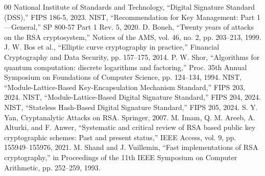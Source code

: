 \documentclass[conference]{IEEEtran}
\begin{document}
\begin{thebibliography}{00}
 National Institute of Standards and Technology, “Digital Signature Standard (DSS),” FIPS 186-5, 2023.
 NIST, “Recommendation for Key Management: Part 1—General,” SP 800-57 Part 1 Rev. 5, 2020.
 D. Boneh, “Twenty years of attacks on the RSA cryptosystem,” Notices of the AMS, vol. 46, no. 2, pp. 203–213, 1999.
 J. W. Bos et al., “Elliptic curve cryptography in practice,” Financial Cryptography and Data Security, pp. 157–175, 2014.
 P. W. Shor, “Algorithms for quantum computation: discrete logarithms and factoring,” Proc. 35th Annual Symposium on Foundations of Computer Science, pp. 124–134, 1994.
 NIST, “Module-Lattice-Based Key-Encapsulation Mechanism Standard,” FIPS 203, 2024.
 NIST, “Module-Lattice-Based Digital Signature Standard,” FIPS 204, 2024.
 NIST, “Stateless Hash-Based Digital Signature Standard,” FIPS 205, 2024.
 S. Y. Yan, Cryptanalytic Attacks on RSA. Springer, 2007. 
 M. Imam, Q. M. Areeb, A. Alturki, and F. Anwer, “Systematic and critical review of RSA based public key cryptographic schemes: Past and present status,” IEEE Access, vol. 9, pp. 155949–155976, 2021. 
 M. Shand and J. Vuillemin, “Fast implementations of RSA cryptography,” in Proceedings of the 11th IEEE Symposium on Computer Arithmetic, pp. 252–259, 1993.
\end{thebibliography}
\end{document}
